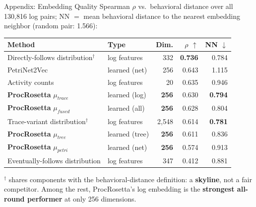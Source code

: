 \documentclass[aspectratio=169]{beamer}
\newcommand{\keyc}[1]{\textbf{\textcolor{procblue}{#1}}}
\newcommand{\keya}[1]{\textbf{\textcolor{procamber!85!black}{#1}}}
\begin{document}
\begin{frame}{Appendix: Embedding Quality}
  Spearman $\rho$ vs.\ behavioral distance over all 130{,}816 log pairs;
  NN $=$ mean behavioral distance to the nearest embedding neighbor
  (random pair: 1.566):
  \vspace{2mm}
  \begin{center}
  \footnotesize
  \begin{tabular}{llrrr}
    \toprule
    Method & Type & Dim. & $\rho$ $\uparrow$ & NN $\downarrow$ \\
    \midrule
    Directly-follows distribution$^\dagger$ & log features & 332 & \keya{0.736} & 0.784 \\
    PetriNet2Vec & learned (net) & 256 & 0.643 & 1.115 \\
    Activity counts & log features & 20 & 0.635 & 0.946 \\
    \keyc{ProcRosetta} $\mu_{\mathit{trace}}$ & learned (log) & \keyc{256} & 0.630 & \keyc{0.794} \\
    \keyc{ProcRosetta} $\mu_{\mathit{fused}}$ & learned (all) & \keyc{256} & 0.628 & 0.804 \\
    Trace-variant distribution$^\dagger$ & log features & 2{,}548 & 0.614 & \keya{0.781} \\
    \keyc{ProcRosetta} $\mu_{\mathit{tree}}$ & learned (tree) & \keyc{256} & 0.611 & 0.836 \\
    \keyc{ProcRosetta} $\mu_{\mathit{petri}}$ & learned (net) & \keyc{256} & 0.574 & 0.913 \\
    Eventually-follows distribution & log features & 347 & 0.412 & 0.881 \\
    \bottomrule
  \end{tabular}
  \end{center}
  \vspace{2mm}
  \small $^\dagger$ shares components with the behavioral-distance definition:
  a \keya{skyline}, not a fair competitor. Among the rest, ProcRosetta's log
  embedding is the \keyc{strongest all-round performer} at only 256 dimensions.
\end{frame}
\end{document}
